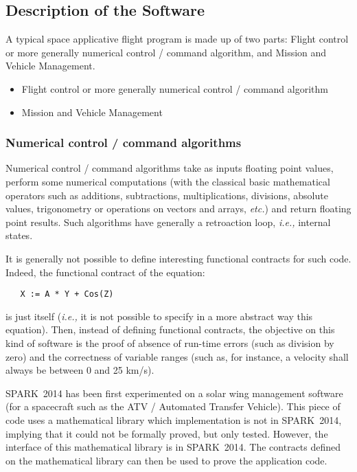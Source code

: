 \documentclass[10pt,a4paper,twocolumn]{article}
\newcommand{\newspark}{SPARK~2014\xspace}
\newcommand{\etc}{\textit{etc.}\xspace}
\newcommand{\ie}{\textit{i.e.,}\xspace}
\begin{document}


\subsection{Description of the Software}

A typical space applicative flight program is made up of two parts:
\ifdefined\abstractonly
Flight control or more generally numerical control / command algorithm, and Mission and Vehicle Management.

\else

\begin{itemize}
\item Flight control or more generally numerical control / command algorithm
\item Mission and Vehicle Management
\end{itemize}
\fi

\subsubsection{Numerical control / command algorithms}

\ifdefined\abstractonly
\else
Numerical control / command algorithms take as inputs floating point values, perform some numerical computations (with the classical basic mathematical operators such as additions, subtractions, multiplications, divisions, absolute values, trigonometry or operations on vectors and arrays, \etc) and return floating point results. Such algorithms have generally a retroaction loop, \ie internal states.

It is generally not possible to define interesting functional contracts for such code. Indeed, the functional contract of the equation:

\begin{verbatim}
   X := A * Y + Cos(Z)
\end{verbatim}

\noindent
is just itself (\ie it is not possible to specify in a more abstract way this equation). Then, instead of defining functional contracts, the objective on this kind of software is the proof of absence of run-time errors (such as division by zero) and the correctness of variable ranges (such as, for instance, a velocity shall always be between 0 and 25 km/s).
\fi

\newspark has been first experimented on a solar wing management software (for a spacecraft such as the ATV / Automated Transfer Vehicle).
This piece of code uses a mathematical library which implementation is not in \newspark, implying that it could not be formally proved, but only tested. However, the interface of this mathematical library is in \newspark. The contracts defined on the mathematical library can then be used to prove the application code.
\end{document}
